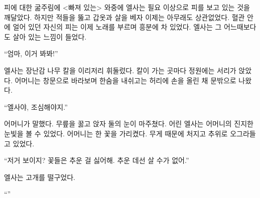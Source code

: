 피에 대한 굶주림에 <빠져 있는> 와중에 엘사는 필요 이상으로 피를 보고 있는 것을 깨달았다. 하지만 적들을 뚫고 갑옷과 살을 베자 이제는 아무래도 상관없었다. 혈관 안에 얼어 있던 자신의 피는 이제 노래를 부르며 흥분에 차 있었다. 엘사는 그 어느때보다도 살아 있는 느낌이 들었다.

``엄마, 이거 봐봐!''

엘사는 장난감 나무 칼을 이리저리 휘둘렀다. 칼이 가는 곳마다 정원에는 서리가 앉았다. 어머니는 창문으로 바라보며 한숨을 내쉬고는 허리에 손을 올린 채 문밖으로 나왔다.

``엘사야, 조심해야지.''

어머니가 말했다. 무릎을 꿇고 앉자 둘의 눈이 마주쳤다. 어린 엘사는 어머니의 진지한 눈빛을 볼 수 있었다. 어머니는 한 꽃을 가리켰다. 무게 때문에 처지고 추위로 오그라들고 있었다.

``저거 보이지? 꽃들은 추운 걸 싫어해. 추운 데선 살 수가 없어.''

엘사는 고개를 떨구었다.

``''